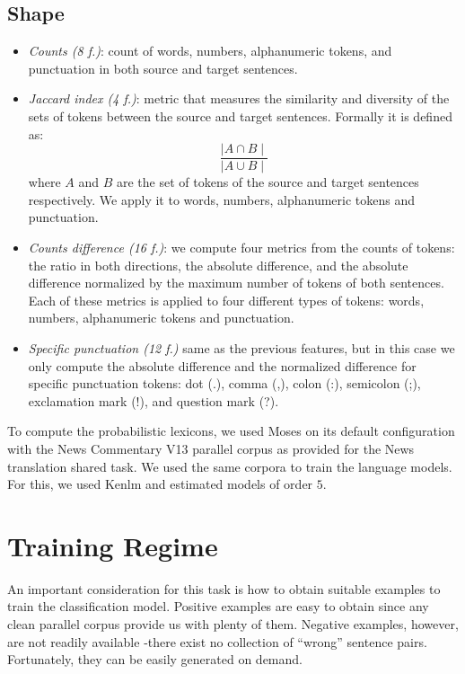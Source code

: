 \documentclass[a0]{sciposter}
\begin{document}
\begin{multicols*}{2}
\subsection*{Shape}
\begin{itemize}
  \item \textit{Counts (8 f.)}: count of words, numbers, alphanumeric tokens, and punctuation in both source and target sentences.
  \item \textit{Jaccard index (4 f.)}: metric that measures the similarity and diversity of the sets of tokens between the source and target sentences. Formally it is defined as:
  $$ \frac{\mid A\cap B\mid}{\mid A\cup B\mid}$$
  where $A$ and $B$ are the set of tokens of the source and target sentences respectively. We apply it to words, numbers, alphanumeric tokens and punctuation.
  \item \textit{Counts difference (16 f.)}: we compute four metrics from the counts of tokens: the ratio in both directions, the absolute difference, and the absolute difference normalized by the maximum number of tokens of both sentences. Each of these metrics is applied to four different types of tokens: words, numbers, alphanumeric tokens and punctuation.
  \item \textit{Specific punctuation (12 f.)} same as the previous features, but in this case we only compute the absolute difference and the normalized difference for specific punctuation tokens: dot (.), comma (,), colon (:), semicolon (;), exclamation mark (!), and question mark (?).
\end{itemize}

To compute the probabilistic lexicons, we used Moses on its default configuration with the News Commentary V13 parallel corpus as provided for the News translation shared task. We used the same corpora to train the language models. For this, we used Kenlm and estimated models of order $5$.


\section*{\Large Training Regime}
An important consideration for this task is how to obtain suitable examples to train the classification model. Positive examples are easy to obtain since any clean parallel corpus provide us with plenty of them. Negative examples, however, are not readily available -there exist no collection of ``wrong'' sentence pairs. Fortunately, they can be easily generated on demand. 


\end{multicols*}
\end{document}
